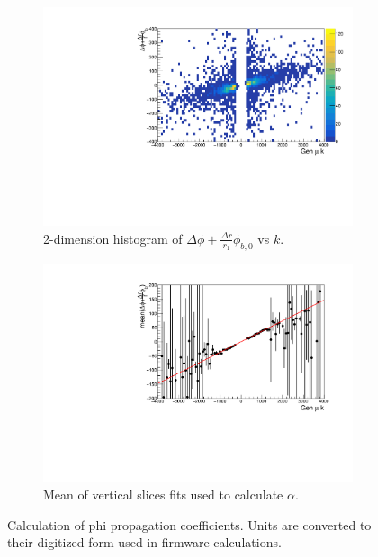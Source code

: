 \begin{figure}[htb!]
	\centering
	\captionsetup{justification=centering}
	\begin{subfigure}[b]{0.45\textwidth}
		\centering
		\includegraphics[width=\textwidth]{figs/04_muons/phiprop_2d.pdf}
		\caption{2-dimension histogram of $\Delta\phi+\frac{\Delta r}{r_1}\phi_{b,0}$ vs $k$.}
		\label{fig:2dprop}
	\end{subfigure}\hspace{0.05\textwidth}
	\begin{subfigure}[b]{0.45\textwidth}
		\centering
		\includegraphics[width=\textwidth]{figs/04_muons/phiprop_mean.pdf}
		\caption{Mean of vertical slices fits used to calculate $\alpha$.}
		\label{fig:2dprop_mean}
	\end{subfigure}
	\caption[Calculation of phi propagation coefficients. Units are converted to their digitized form used in firmware calculations.]
	{Calculation of phi propagation coefficients. Units are converted to their digitized form used in firmware calculations.}
	\label{fig:phi_prop}
\end{figure}

